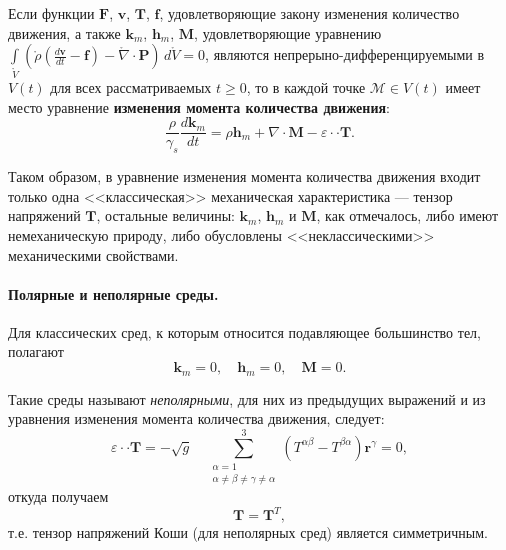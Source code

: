 \begin{theorem*}
	Если функции $\mathbf{F}$, $\mathbf{v}$, $\mathbf{T}$, $\mathbf{f}$, удовлетворяющие закону изменения количество движения, а также $\mathbf{k}_m$, $\mathbf{h}_m$, $\mathbf{M}$, удовлетворяющие уравнению $\int\limits_{\mathring{V}} \left(\mathring{\rho} \left(\frac{d\mathbf{v}}{dt} - \mathbf{f}\right) - \mathring{\nabla} \cdot \mathbf{P}\right) \, d\mathring{V} = 0$, являются непрерыно-дифференцируемыми в $V(t)$ для всех рассматриваемых $t \geqslant 0$, то в каждой точке $\mathcal{M} \in V(t)$ имеет место уравнение \textbf{изменения момента количества движения}:
	\begin{equation*}
		\frac{\rho}{\gamma_s} \frac{d\mathbf{k}_m}{dt} = \rho \mathbf{h}_m + \nabla \cdot \mathbf{M} - \varepsilon \cdot \cdot \mathbf{T}.
	\end{equation*}
\end{theorem*}

Таком образом, в уравнение изменения момента количества движения входит только одна <<классическая>> механическая характеристика --- тензор напряжений $\mathbf{T}$, остальные величины: $\mathbf{k}_m$, $\mathbf{h}_m$ и $\mathbf{M}$, как отмечалось, либо имеют немеханическую природу, либо обусловлены <<неклассическими>> механическими свойствами. 

\paragraph{Полярные и неполярные среды.} Для классических сред, к которым относится подавляющее большинство тел, полагают
\begin{equation*}
	\mathbf{k}_m = 0, \quad \mathbf{h}_m = 0, \quad \mathbf{M} = 0.
\end{equation*}

Такие среды называют \textit{неполярными}, для них из предыдущих выражений и из уравнения изменения момента количества движения, следует:
\begin{equation*}
	\varepsilon \cdot \cdot \mathbf{T} = - \sqrt{g} \quad \sum\limits_{\begin{matrix}
			\alpha = 1 \\
			\alpha \not = \beta \not = \gamma \not = \alpha
	\end{matrix}}^{3} \left(T^{\alpha\beta} - T^{\beta\alpha}\right)\mathbf{r}^{\gamma} = 0,
\end{equation*}
откуда получаем
\begin{equation*}
	\mathbf{T} = \mathbf{T}^{T}, 
\end{equation*}
т.е. тензор напряжений Коши (для неполярных сред) является симметричным. 

